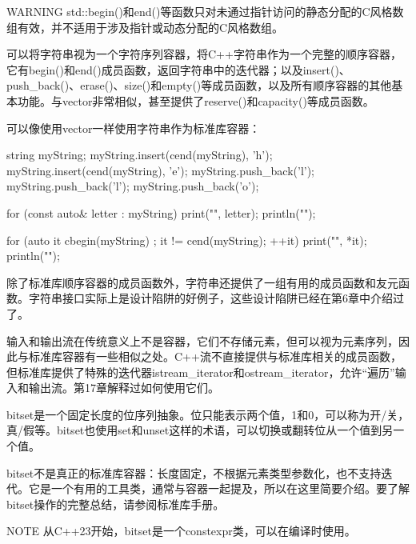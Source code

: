 \begin{myWarning}{WARNING}
std::begin()和end()等函数只对未通过指针访问的静态分配的C风格数组有效，并不适用于涉及指针或动态分配的C风格数组。
\end{myWarning}


可以将字符串视为一个字符序列容器，将C++字符串作为一个完整的顺序容器，它有begin()和end()成员函数，返回字符串中的迭代器；以及insert()、push\_back()、erase()、size()和empty()等成员函数，以及所有顺序容器的其他基本功能。与vector非常相似，甚至提供了reserve()和capacity()等成员函数。

可以像使用vector一样使用字符串作为标准库容器：

\begin{cpp}
string myString;
myString.insert(cend(myString), 'h');
myString.insert(cend(myString), 'e');
myString.push_back('l');
myString.push_back('l');
myString.push_back('o');

for (const auto& letter : myString) {
    print("{}", letter);
}
println("");

for (auto it { cbegin(myString) }; it != cend(myString); ++it) {
    print("{}", *it);
}
println("");
\end{cpp}

除了标准库顺序容器的成员函数外，字符串还提供了一组有用的成员函数和友元函数。字符串接口实际上是设计陷阱的好例子，这些设计陷阱已经在第6章中介绍过了。


输入和输出流在传统意义上不是容器，它们不存储元素，但可以视为元素序列，因此与标准库容器有一些相似之处。C++流不直接提供与标准库相关的成员函数，但标准库提供了特殊的迭代器istream\_iterator和ostream\_iterator，允许“遍历”输入和输出流。第17章解释过如何使用它们。


bitset是一个固定长度的位序列抽象。位只能表示两个值，1和0，可以称为开/关，真/假等。bitset也使用set和unset这样的术语，可以切换或翻转位从一个值到另一个值。

bitset不是真正的标准库容器：长度固定，不根据元素类型参数化，也不支持迭代。它是一个有用的工具类，通常与容器一起提及，所以在这里简要介绍。要了解bitset操作的完整总结，请参阅标准库手册。


\begin{myNotic}{NOTE}
从C++23开始，bitset是一个constexpr类，可以在编译时使用。
\end{myNotic}

